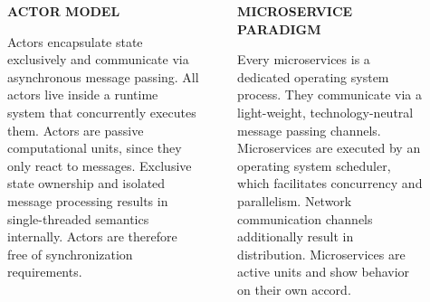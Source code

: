 \documentclass[final,hyperref={pdfpagelabels=true}]{beamer}
\begin{document}
\begin{frame}
  \vspace*{2\baselineskip}

  \begin{columns}[t]
    \begin{column}{.03\textwidth}
    \end{column}
    \begin{column}{.44\textwidth}
      \textsf{\textbf{ACTOR MODEL}} \\
      \vspace*{\baselineskip}
      {\lmodern
        \begin{justify}
        Actors encapsulate state exclusively and communicate via asynchronous message passing. All actors live inside a runtime system that concurrently executes them. Actors are passive computational units, since they only react to messages. Exclusive state ownership and isolated message processing results in single-threaded semantics internally. Actors are therefore free of synchronization requirements.
        \end{justify}
      }
    \end{column}
    \begin{column}{.06\textwidth}
    \end{column}
    \begin{column}{.44\textwidth}
      \textsf{\textbf{MICROSERVICE PARADIGM}} \\
      \vspace*{\baselineskip}
      {\lmodern
        \begin{justify}
        Every microservices is a dedicated operating system process. They communicate via a light-weight, technology-neutral message passing channels. Microservices are executed by an operating system scheduler, which facilitates concurrency and parallelism. Network communication channels additionally result in distribution. Microservices are active units and show behavior on their own accord.
        \end{justify}
      }
    \end{column}
    \begin{column}{.03\textwidth}
    \end{column}
  \end{columns}

  \vspace*{2\baselineskip}
  

\end{frame}
\end{document}
